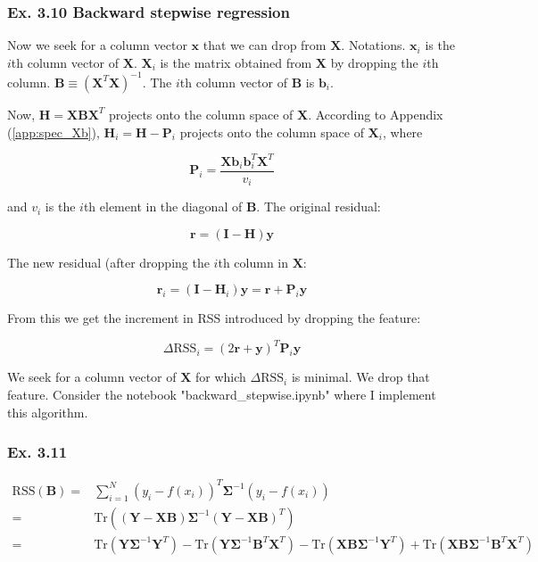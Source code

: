 \documentclass{article}
\begin{document}
\subsubsection{Ex. 3.10 Backward stepwise regression}

Now we seek for a column vector $\mathbf{x}$ that we can drop from $\mathbf{X}$. Notations. $\mathbf{x}_i$ is the $i$th column vector of $\mathbf{X}$. $\mathbf{X}_i$ is the matrix obtained from $\mathbf{X}$ by dropping the $i$th column. $\mathbf{B} \equiv (\mathbf{X}^T\mathbf{X})^{-1}$. The $i$th column vector of $\mathbf{B}$ is $\mathbf{b}_i$.

Now, $\mathbf{H} = \mathbf{X}\mathbf{B}\mathbf{X}^T$ projects onto the column space of $\mathbf{X}$. According to Appendix (\ref{app:spec_Xb}), $\mathbf{H}_i = \mathbf{H} - \mathbf{P}_i$ projects onto the column space of $\mathbf{X}_i$, where

\[
\mathbf{P}_i = \frac{\mathbf{X}\mathbf{b}_i \mathbf{b}^T_i \mathbf{X}^T}{v_i}
\]

and $v_i$ is the $i$th element in the diagonal of $\mathbf{B}$. The original residual:

\[
\mathbf{r} = (\mathbf{I} - \mathbf{H})\mathbf{y}
\]

The new residual (after dropping the $i$th column in $\mathbf{X}$:

\[
\mathbf{r}_i = (\mathbf{I} - \mathbf{H}_i)\mathbf{y} = \mathbf{r} + \mathbf{P}_i \mathbf{y}
\]

From this we get the increment in RSS introduced by dropping the feature:

\[
\Delta \text{RSS}_i = (2\mathbf{r} + \mathbf{y})^T \mathbf{P}_i \mathbf{y}
\]

We seek for a column vector of $\mathbf{X}$ for which $\Delta\text{RSS}_i$ is minimal. We drop that feature. Consider the notebook "backward\_stepwise.ipynb" where I implement this algorithm.

\subsubsection{Ex. 3.11}

\[
\begin{split}
\text{RSS}(\mathbf{B}) =& \sum_{i=1}^{N} (y_i -f(x_i))^T \mathbf{\Sigma}^{-1} (y_i - f(x_i))\\
=& \text{Tr}\left( (\mathbf{Y} - \mathbf{X} \mathbf{B}) \mathbf{\Sigma}^{-1} (\mathbf{Y} - \mathbf{X} \mathbf{B})^T \right)\\
=&\text{Tr}(\mathbf{Y} \mathbf{\Sigma}^{-1} \mathbf{Y}^T) - \text{Tr}(\mathbf{Y} \mathbf{\Sigma}^{-1} \mathbf{B}^T \mathbf{X}^T) - \text{Tr}(\mathbf{X}\mathbf{B}\mathbf{\Sigma}^{-1}\mathbf{Y}^T) + \text{Tr}(\mathbf{X} \mathbf{B} \mathbf{\Sigma}^{-1} \mathbf{B}^T \mathbf{X}^T)
\end{split}
\]
\end{document}
